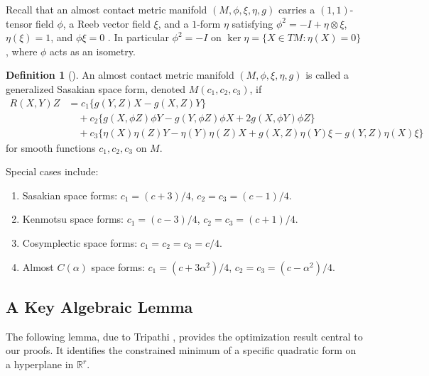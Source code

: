 \documentclass[11pt]{amsart}
\theoremstyle{plain}
\theoremstyle{definition}
\newtheorem{definition}[proposition]{Definition}
\theoremstyle{remark}
\begin{document}
Recall that an almost contact metric manifold $(M,\phi,\xi,\eta,g)$
carries a $(1,1)$-tensor field $\phi$, a Reeb vector field $\xi$, and a
$1$-form $\eta$ satisfying $\phi^2=-I+\eta\otimes\xi$, $\eta(\xi)=1$, and
$\phi\xi=0$ \cite{Blair2010,Yano1984}. In particular $\phi^2=-I$ on $\ker\eta=\{X\in TM:\eta(X)=0\}$, where
$\phi$ acts as an isometry.

\begin{definition}[\cite{Alegre2004, Blair2010}]
\label{def:gen_sasakian_space_form}
An almost contact metric manifold $(M,\phi,\xi,\eta,g)$ is 
called a {generalized Sasakian space form}, denoted 
$M(c_1,c_2,c_3)$, if
\begin{align}\label{eq:gen_sasakian_curvature}
R(X,Y)Z &= c_1\{g(Y,Z)X - g(X,Z)Y\} \nonumber\\
&\quad + c_2\{g(X,\phi Z)\phi Y - g(Y,\phi Z)\phi X 
            + 2g(X,\phi Y)\phi Z\} \nonumber\\
&\quad + c_3\{\eta(X)\eta(Z)Y - \eta(Y)\eta(Z)X 
            + g(X,Z)\eta(Y)\xi - g(Y,Z)\eta(X)\xi\}
\end{align}
for smooth functions $c_1, c_2, c_3$ on $M$.
\end{definition}

Special cases include:
\begin{enumerate}[label=(\roman*)]
\item {Sasakian space forms}: 
      $c_1 = (c+3)/4$, $c_2 = c_3 = (c-1)/4$.
\item {Kenmotsu space forms}: 
      $c_1 = (c-3)/4$, $c_2 = c_3 = (c+1)/4$.
\item {Cosymplectic space forms}: 
      $c_1 = c_2 = c_3 = c/4$.
\item {Almost $C(\alpha)$ space forms}: 
      $c_1 = (c+3\alpha^2)/4$, 
      $c_2 = c_3 = (c-\alpha^2)/4$.
\end{enumerate}

\subsection{A Key Algebraic Lemma}

The following lemma, due to Tripathi \cite{Tripathi2017}, 
provides the optimization result central to our proofs. It 
identifies the constrained minimum of a specific quadratic 
form on a hyperplane in $\mathbb{R}^r$.
\end{document}
